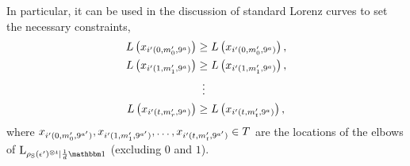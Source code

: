 In particular, it can be used in the discussion of standard Lorenz curves to set the necessary constraints,
\begin{align}
L\left(x_{i'(0, \mlt'_{0}, 9^{\mm})}\right) &\geq L\left(x_{i'(0, m'_{0}, 9^{\mm})}\right), \nonumber\\
L\left(x_{i'(1, \mlt'_{1}, 9^{\mm})}\right) &\geq L\left(x_{i'(1, m'_{1}, 9^{\mm})}\right), \nonumber\\
&\vdotswithin{=} \nonumber\\
L\left(x_{i'(\tt, \mlt'_{r}, 9^{\mm})}\right) &\geq L\left(x_{i'(\tt, m'_{\tt}, 9^{\mm})}\right), \nonumber
\end{align}
where $x_{i'(0, m'_{0}, 9^{a'})}, x_{i'(1, m'_{1}, 9^{a'})}, \dots, x_{i'(t, m'_{t}, 9^{a'})} \in T$ are the locations of the elbows of $\lc{\rho_{\rm{S}}(\epsilon')\too{\tt}}{\frac{1}{d}\id}$ (excluding $0$ and $1$).



